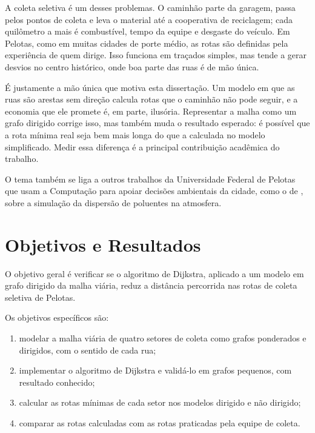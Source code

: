 \documentclass[diss-proposta]{texufpel}
\begin{document}
A coleta seletiva é um desses problemas. O caminhão parte da garagem, passa
pelos pontos de coleta e leva o material até a cooperativa de reciclagem; cada
quilômetro a mais é combustível, tempo da equipe e desgaste do veículo. Em
Pelotas, como em muitas cidades de porte médio, as rotas são definidas pela
experiência de quem dirige. Isso funciona em traçados simples, mas tende a
gerar desvios no centro histórico, onde boa parte das ruas é de mão única.

É justamente a mão única que motiva esta dissertação. Um modelo em que as ruas
são arestas sem direção calcula rotas que o caminhão não pode seguir, e a
economia que ele promete é, em parte, ilusória. Representar a malha como um
grafo dirigido corrige isso, mas também muda o resultado esperado: é possível
que a rota mínima real seja bem mais longa do que a calculada no modelo
simplificado. Medir essa diferença é a principal contribuição acadêmica do
trabalho.

O tema também se liga a outros trabalhos da Universidade Federal de Pelotas que usam a Computação para
apoiar decisões ambientais da cidade, como o de \citet{Cruz:2015:FCS}, sobre a
simulação da dispersão de poluentes na atmosfera.

\chapter{Objetivos e Resultados}

O objetivo geral é verificar se o algoritmo de Dijkstra, aplicado a um modelo
em grafo dirigido da malha viária, reduz a distância percorrida nas rotas de
coleta seletiva de Pelotas.

Os objetivos específicos são:

\begin{enumerate}
  \item modelar a malha viária de quatro setores de coleta como grafos
        ponderados e dirigidos, com o sentido de cada rua;
  \item implementar o algoritmo de Dijkstra e validá-lo em grafos pequenos,
        com resultado conhecido;
  \item calcular as rotas mínimas de cada setor nos modelos dirigido e não
        dirigido;
  \item comparar as rotas calculadas com as rotas praticadas pela equipe de
        coleta.
\end{enumerate}
\end{document}
